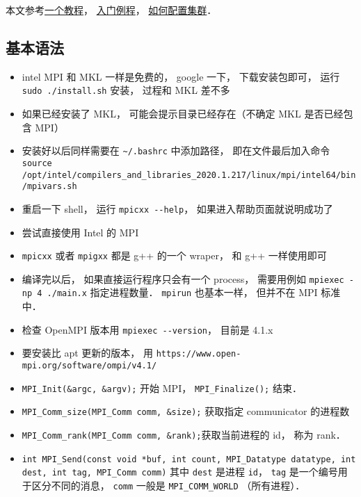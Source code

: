 
\begin{issues}
\issueDraft
\end{issues}

本文参考\href{https://www.codingame.com/playgrounds/349/introduction-to-mpi/introduction-to-distributed-computing}{一个教程}， \href{https://people.sc.fsu.edu/~jburkardt/cpp_src/hello_mpi/hello_mpi.html}{入门例程}， \href{https://mpitutorial.com/tutorials/running-an-mpi-cluster-within-a-lan/}{如何配置集群}．

\subsection{基本语法}
\begin{itemize}
\item intel MPI 和 MKL 一样是免费的， google 一下， 下载安装包即可， 运行 \verb`sudo ./install.sh` 安装， 过程和 MKL 差不多
\item 如果已经安装了 MKL， 可能会提示目录已经存在（不确定 MKL 是否已经包含 MPI）
\item 安装好以后同样需要在 \verb`~/.bashrc` 中添加路径， 即在文件最后加入命令 \verb`source /opt/intel/compilers_and_libraries_2020.1.217/linux/mpi/intel64/bin/mpivars.sh`
\item 重启一下 shell， 运行 \verb`mpicxx --help`， 如果进入帮助页面就说明成功了
\item 尝试直接使用 Intel 的 MPI
\item \verb`mpicxx` 或者 \verb`mpigxx` 都是 g++ 的一个 wraper， 和 g++ 一样使用即可
\item 编译完以后， 如果直接运行程序只会有一个 process， 需要用例如 \verb|mpiexec -np 4 ./main.x| 指定进程数量． \verb|mpirun| 也基本一样， 但并不在 MPI 标准中．
\item 检查 OpenMPI 版本用 \verb|mpiexec --version|， 目前是 4.1.x
\item 要安装比 apt 更新的版本， 用 \verb|https://www.open-mpi.org/software/ompi/v4.1/|
\item \verb|MPI_Init(&argc, &argv);| 开始 MPI， \verb|MPI_Finalize();| 结束．
\item \verb|MPI_Comm_size(MPI_Comm comm, &size);| 获取指定 communicator 的进程数
\item \verb|MPI_Comm_rank(MPI_Comm comm, &rank);|获取当前进程的 id， 称为 rank．
\item \verb|int MPI_Send(const void *buf, int count, MPI_Datatype datatype, int dest, int tag, MPI_Comm comm)| 其中 \verb|dest| 是进程 \verb|id|， \verb|tag| 是一个编号用于区分不同的消息， \verb|comm| 一般是 \verb|MPI_COMM_WORLD| （所有进程）．

\end{itemize}
